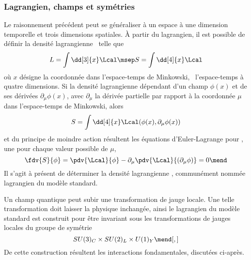 \subsubsection{Lagrangien, champs et symétries}\label{chapter-MS-MSSM-section-formalisme-subsec-into_lagrangien-subsubsec-lagrangien_champs_symetries}
Le raisonnement précédent peut se généraliser à un espace à une dimension temporelle et trois dimensions spatiales.
À partir du lagrangien, il est possible de définir la densité lagrangienne \Lcal\ telle que
\begin{equation}
L = \int\dd[3]{x}\Lcal
\msep
S = \int\dd[4]{x}\Lcal
\end{equation}
où $x$ désigne la coordonnée dans l'espace-temps de Minkowski, \ie\ l'espace-temps à quatre dimensions.
Si la densité lagrangienne dépendant d'un champ $\phi(x)$ et de ses dérivées $\partial_\mu\phi(x)$,
avec $\partial_\mu$ la dérivée partielle par rapport à la coordonnée $\mu$ dans l'espace-temps de Minkowski,
alors
\begin{equation}
S = \int\dd[4]{x}\Lcal(\phi(x),\partial_\mu\phi(x))
\end{equation}
et du principe de moindre action résultent les équations d'Euler-Lagrange pour \Lcal,
une pour chaque valeur possible de $\mu$,
\begin{equation}
\fdv{S}{\phi}
=
\pdv{\Lcal}{\phi} - \partial_\mu\pdv{\Lcal}{(\partial_\mu\phi)} = 0
\mend
\end{equation}
Il s'agit à présent de déterminer la densité lagrangienne \Lcal, communément nommée lagrangien du modèle standard.
\par Un champ quantique peut subir une transformation de jauge locale. Une telle transformation doit laisser la physique inchangée, ainsi le lagrangien du modèle standard est construit pour être invariant sous les transformations de jauges locales du groupe de symétrie
\begin{equation}
SU(3)_C \times SU(2)_L \times U(1)_Y
\mend[,]
\label{eq-symmetries_lagrangien_SM}
\end{equation}
De cette construction résultent les interactions fondamentales, discutées ci-après.






